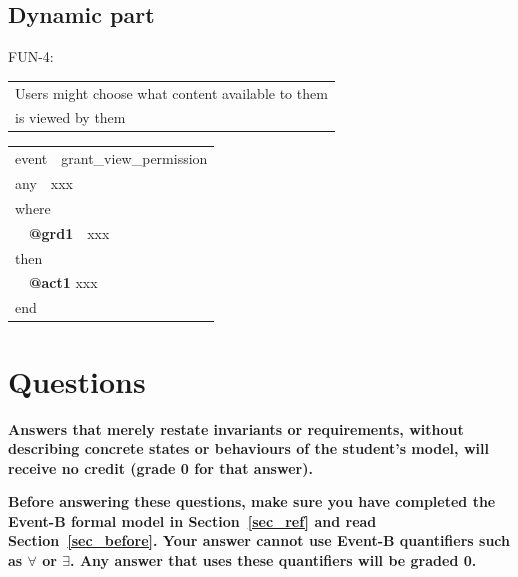 \documentclass{article} %
\newcommand{\ebkeyw}[1]{\textcolor{pred}{\textsf{#1}}}
\newcommand{\ebtag}[1]{\textcolor{pgrey}{\textsf{\bf #1}}}
\begin{document}
\subsection{Dynamic part}


\begin{center}
{\color{red!100}FUN-4}:
\begin{tabular}{|l|} \hline
Users might choose what content available to them \\ is viewed by them \\
\hline
\end{tabular}
\end{center}
%
\begin{center}
\begin{tabular}{l}
\ebkeyw{event}~~grant\_view\_permission\\
\ebkeyw{any}~~xxx\\
\ebkeyw{where}\\
 ~~\ebtag{@grd1}~~xxx\\
  \ebkeyw{then}\\
 ~~\ebtag{@act1} xxx\\
  \ebkeyw{end} 
\end{tabular}
\end{center} 


\section{Questions}

{\bf Answers that merely restate invariants or requirements, without describing concrete states or behaviours of the student's model, will receive no credit (grade 0 for that answer).  } \\ \medskip

{\bf Before answering these questions, make sure you have completed the Event-B formal model in Section~\ref{sec_ref} and read Section~\ref{sec_before}. Your answer cannot use Event-B quantifiers such as $\forall$ or $\exists$. Any answer that uses these quantifiers will be graded 0.} \\
\end{document}
